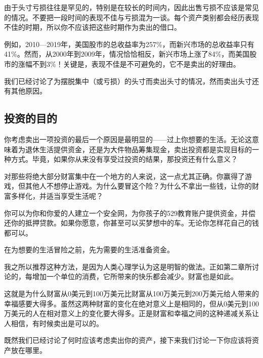 由于头寸亏损往往是罕见的，特别是在较长的时间内，因此出售亏损不应该是常见的情况。不要把一段时间的表现不佳与亏损混为一谈。每个资产类别都会经历表现不佳的时期，所以你不应该把这些时期作为卖出的借口。

例如，2010—2019年，美国股市的总收益率为257\%，而新兴市场的总收益率只有41\%。然而，从2000年到2009年，情况恰恰相反，新兴市场上涨了84\%，而美国股市的涨幅不到3\%！关键是，表现不佳是不可避免的，它不是卖出的好理由。

我们已经讨论了为摆脱集中（或亏损）的头寸而卖出头寸的情况，然而卖出头寸还有其他原因。

\subsection{投资的目的}

你考虑卖出一项投资的最后一个原因是最明显的——过上你想要的生活。无论这意味着为退休生活提供资金，还是为大件物品筹集现金，卖出投资都是实现目标的一种方式。毕竟，如果你从来没有享受过投资的结果，那投资还有什么意义？

对那些将绝大部分财富集中在一个地方的人来说，这一点尤其正确。你赢得了游戏，但其他人不想停止游戏。为什么要冒这个险？为什么不拿出一些钱，让你的财富多样化，并适当享受生活呢？

你可以为你和你爱的人建立一个安全网，为你孩子的529教育账户提供资金，并偿还你的抵押贷款。如果你愿意，你甚至可以买梦想中的车。无论你怎样花自己的钱都可以。

在为想要的生活冒险之前，先为需要的生活准备资金。

我之所以推荐这种方法，是因为人类心理学认为这是明智的做法。正如第二章所讨论的，每增加一个单位的消费，它所带来的快乐都会减少。财富也是如此。

这就是为什么财富从0美元到100万美元比财富从100万美元到200万美元给人带来的幸福感要大得多。虽然这两种财富的变化在绝对意义上是相同的，但从0美元到100万美元的人在相对意义上的变化要大得多。正是财富和幸福之间的这种递减关系让人相信，有时候卖出是可以的。

既然我们已经讨论了何时应该考虑卖出你的资产，接下来我们讨论一下你应该将资产放在哪里。

